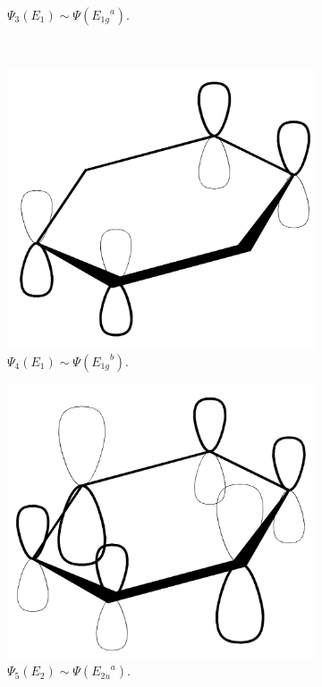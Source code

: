\documentclass[../notes.tex]{subfiles}
\begin{document}
\begin{itemize}
\begin{itemize}
\begin{figure}[h!]
\begin{subfigure}[b]{0.25\linewidth}
                \caption{$\Psi_3(E_1)\sim\Psi({E_{1g}}^a)$.}
                \label{fig:benzeneMOsc}
            \end{subfigure}\\[1em]
            \begin{subfigure}[b]{0.25\linewidth}
                \centering
                \includegraphics[width=0.7\linewidth]{../ExtFiles/benzeneMOsd.png}
                \caption{$\Psi_4(E_1)\sim\Psi({E_{1g}}^b)$.}
                \label{fig:benzeneMOsd}
            \end{subfigure}
            \begin{subfigure}[b]{0.25\linewidth}
                \centering
                \includegraphics[width=0.7\linewidth]{../ExtFiles/benzeneMOse.png}
                \caption{$\Psi_5(E_2)\sim\Psi({E_{2u}}^a)$.}
                \label{fig:benzeneMOse}
            \end{subfigure}
            \begin{subfigure}[b]{0.25\linewidth}

\end{subfigure}
\end{figure}
\end{itemize}
\end{itemize}
\end{document}
